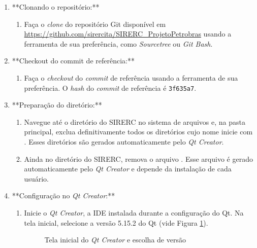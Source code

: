 \documentclass[a4paper,11pt]{article}
\newcommand{\sistema}{\textsf{SIRERC}}
\newcommand{\qtcreator}{\textit{Qt Creator}}
\begin{document}
\begin{enumerate}
	\item **Clonando o repositório:**
	\begin{enumerate}
		\item Faça o \emph{clone} do repositório Git disponível em \url{https://github.com/sirercita/SIRERC_ProjetoPetrobras} usando a ferramenta de sua preferência, como \textit{Sourcetree} ou \textit{Git Bash}.
	\end{enumerate}
	
	\item **Checkout do commit de referência:**
	\begin{enumerate}
		\item Faça o \emph{checkout} do \emph{commit} de referência usando a ferramenta de sua preferência. O \emph{hash} do \emph{commit} de referência é \texttt{3f635a7}.
	\end{enumerate}
	
	\item **Preparação do diretório:**
	\begin{enumerate}
		\item Navegue até o diretório do \sistema{} no sistema de arquivos e, na pasta principal, exclua definitivamente todos os diretórios cujo nome inicie com . Esses diretórios são gerados automaticamente pelo \qtcreator{}.
		\item Ainda no diretório do \sistema{}, remova o arquivo . Esse arquivo é gerado automaticamente pelo \qtcreator{} e depende da instalação de cada usuário.
	\end{enumerate}
	
	\item **Configuração no \qtcreator{}:**
	\begin{enumerate}
		\item Inicie o \qtcreator{}, a IDE instalada durante a configuração do Qt. Na tela inicial, selecione a versão 5.15.2 do Qt (vide Figura \ref{fig:qtcreatorver}).
		
		\begin{figure}[H]\centering
			\caption{Tela inicial do \qtcreator{} e escolha de versão}\label{fig:qtcreatorver}
		\end{figure}
		

\end{enumerate}
\end{enumerate}
\end{document}
